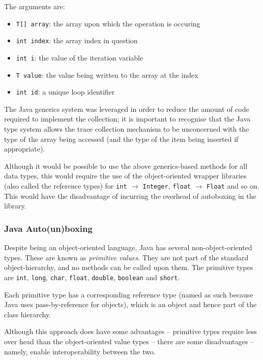 	The arguments are:
	
	\begin{itemize} \label{items:trace-args}
		\item \texttt{T[] array}: the array upon which the operation is occuring
		\item \texttt{int index}: the array index in question
		\item \texttt{int i}: the value of the iteration variable
		\item \texttt{T value}: the value being written to the array at the index
		\item \texttt{int id}: a unique loop identifier
	\end{itemize}
	
	The Java generics system was leveraged in order to reduce the amount of code required to implement the collection; it is important to recognise that the Java type system allows the trace collection mechanism to be unconcerned with the type of the array being accessed (and the type of the item being inserted if appropriate).
	
	Although it would be possible to use the above generics-based methods for all data types, this would require the use of the object-oriented wrapper libraries (also called the reference types) for \texttt{int} $\rightarrow$ \texttt{Integer}, \texttt{float} $\rightarrow$ \texttt{Float} and so on. This would have the disadvantage of incurring the overhead of autoboxing \citep{boxing} in the library.
	
		\subsubsection{Java Auto(un)boxing} \label{sec:runtime/implementation/instrument/boxing}
		Despite being an object-oriented language, Java has several non-object-oriented types. These are known as \textit{primitive values}. They are not part of the standard object-hierarchy, and no methods can be called upon them. The primitive types are \texttt{int}, \texttt{long}, \texttt{char}, \texttt{float}, \texttt{double}, \texttt{boolean} and \texttt{short}.
		
		Each primitive type has a corresponding reference type (named as such because Java uses pass-by-reference for objects), which is an object and hence part of the class hierarchy.
		
		Although this approach does have some advantages -- primitive types require less over head than the object-oriented value types -- there are some disadvantages -- namely, enable interoperability between the two.
		
